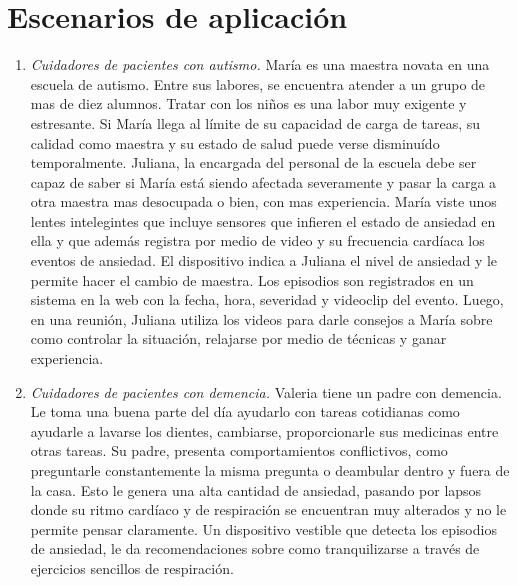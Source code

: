 \documentclass[letterpaper,12pt]{cicese}
\begin{document}
			\section{Escenarios de aplicaci\'on}
				\begin{enumerate}
					\item \emph{Cuidadores de pacientes con autismo.}
					Mar\'ia es una maestra novata en una escuela de autismo. Entre sus labores, se encuentra
					atender a un grupo de mas de diez alumnos. Tratar con los ni\~nos es una labor muy exigente y estresante. Si Mar\'ia llega al l\'imite de su capacidad
					de carga de tareas, su calidad como maestra y su estado de salud puede verse disminu\'ido temporalmente. Juliana, la encargada del personal de la
					escuela debe ser capaz de saber si Mar\'ia est\'a siendo afectada severamente y pasar la carga a otra maestra mas desocupada o bien, con mas experiencia. Mar\'ia
					viste unos lentes intelegintes que incluye sensores que infieren el estado de ansiedad en ella y que adem\'as registra por medio de video y su
					frecuencia card\'iaca los eventos de ansiedad. El dispositivo indica a Juliana el nivel de ansiedad y le permite hacer el cambio de maestra. Los episodios son registrados
					en un sistema en la web con la fecha, hora, severidad y videoclip del evento. Luego,
					en una reuni\'on, Juliana utiliza los videos para darle consejos a Mar\'ia sobre como controlar la situaci\'on, relajarse por medio de t\'ecnicas
					y ganar experiencia.
					\item \emph{Cuidadores de pacientes con demencia.}
						Valeria tiene un padre con demencia. Le toma una buena parte del d\'ia ayudarlo
						con tareas cotidianas como ayudarle a lavarse los dientes, cambiarse, proporcionarle sus medicinas entre
						otras tareas. Su padre, presenta comportamientos conflictivos, como preguntarle constantemente la misma pregunta o deambular dentro y fuera de la casa. Esto le genera una alta cantidad de ansiedad, pasando por lapsos donde su ritmo card\'iaco y de respiraci\'on se encuentran muy alterados y no le permite pensar
						claramente. Un dispositivo vestible que detecta los episodios de ansiedad, le da recomendaciones sobre como tranquilizarse a trav\'es de
						ejercicios sencillos de respiraci\'on.
				\end{enumerate}
\end{document}
